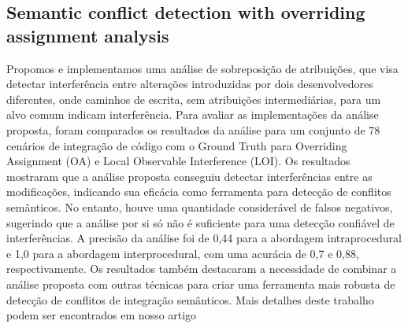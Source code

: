 \documentclass[sigconf,review]{acmart}
\begin{document}
\subsection{Semantic conflict detection with overriding assignment analysis}
Propomos e implementamos uma análise de sobreposição de atribuições, que visa detectar interferência entre alterações introduzidas por dois desenvolvedores diferentes, onde caminhos de escrita, sem atribuições intermediárias, para um alvo comum indicam interferência. Para avaliar as implementações da análise proposta, foram comparados os resultados da análise para um conjunto de 78 cenários de integração de código com o Ground Truth para Overriding Assignment (OA) e Local Observable Interference (LOI). Os resultados mostraram que a análise proposta conseguiu detectar interferências entre as modificações, indicando sua eficácia como ferramenta para detecção de conflitos semânticos. No entanto, houve uma quantidade considerável de falsos negativos, sugerindo que a análise por si só não é suficiente para uma detecção confiável de interferências. A precisão da análise foi de 0,44 para a abordagem intraprocedural e 1,0 para a abordagem interprocedural, com uma acurácia de 0,7 e 0,88, respectivamente. Os resultados também destacaram a necessidade de combinar a análise proposta com outras técnicas para criar uma ferramenta mais robusta de detecção de conflitos de integração semânticos. 
Mais detalhes deste trabalho podem ser encontrados em nosso artigo \cite{10.1145/3555228.3555242}
\end{document}
